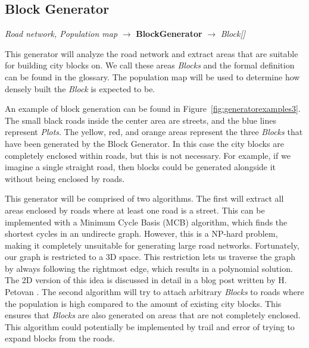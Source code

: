 \subsection{Block Generator}
\begin{center}
    \textit{Road network, Population map} $\rightarrow$ \textbf{BlockGenerator} $\rightarrow$ \textit{Block{[}{]}}
\end{center}
This generator will analyze the road network and extract areas that are suitable for building city blocks on.
We call these areas \textit{Blocks} and the formal definition can be found in the glossary.
The population map will be used to determine how densely built the \textit{Block} is expected to be.

An example of block generation can be found in Figure~\ref{fig:generatorexamples3}.
The small black roads inside the center area are streets, and the blue lines represent \textit{Plots}.
The yellow, red, and orange areas represent the three \textit{Blocks} that have been generated by the Block Generator.
In this case the city blocks are completely enclosed within roads, but this is not necessary.
For example, if we imagine a single straight road, then blocks could be generated alongside it without being enclosed by roads.

This generator will be comprised of two algorithms.
The first will extract all areas enclosed by roads where at least one road is a street.
This can be implemented with a Minimum Cycle Basis (MCB) algorithm, which finds the shortest cycles in an undirecte graph.
However, this is a NP-hard problem, making it completely unsuitable for generating large road networks.
Fortunately, our graph is restricted to a 3D space.
This restriction lets us traverse the graph by always following the rightmost edge, which results in a polynomial solution.
The 2D version of this idea is discussed in detail in a blog post written by H. Petovan \cite{mcb}.
The second algorithm will try to attach arbitrary \textit{Blocks} to roads where the population is high compared to the amount of existing city blocks.
This ensures that \textit{Blocks} are also generated on areas that are not completely enclosed.
This algorithm could potentially be implemented by trail and error of trying to expand blocks from the roads.